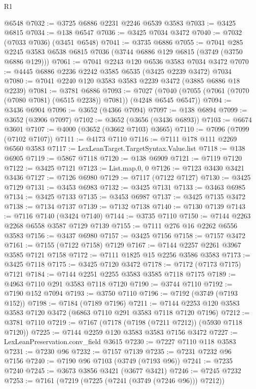 \begin{lexlean}{R1}
\begin{coremodule}
    @6548
@7032 := @3725 @6886 @2231 @2246 @6539 @3583
@7033 := @3425 @6815
@7034 := @138 @6547
@7036 := @3425 @7034 @3472
@7040 := @7032 (@7033 @7036) (@3451 @6548)
@7041 := @3735 @6886
@7055 := @7041
    @285
    @2245
    @3583
    @6538
    @6815
    @7036
    (@3744 @6886 @129 @6815 (@3749 (@3750 @6886 @129)))
@7061 := @7041 @2243 @120 @6536 @3583 @7034 @3472
@7070 := @4445 @6886 @2236 @2242 @3585 @6535 (@3425 @2239 @3472) @7034
@7080 := @7041 @2240 @120 @3583 @3583 @2239 @3472 (@3885 @6886 @18 @2239)
@7081 := @3781 @6886
@7093 := @7027 (@7040 (@7055 (@7061 (@7070 (@7080 @7081) (@6515 @2238)) @7081)) (@4248 @6545 @6547))
@7094 := @3436 @6904
@7096 := @3652 (@4366 @7094)
@7097 := @138 @6894
@7099 := @3652 (@3906 @7097)
@7102 := @3652 (@3656 (@3436 @6893))
@7103 := @6674 @3601
@7107 := @4000 (@3652 (@3662 @7103) @3665)
@7110 := @7096 (@7099 (@7102 @7107))
@7111 := @4173 @7110
@7116 := @7111 @178 @111 @2269 @6560 @3583
@7117 := LexLeanTarget.TargetSyntax.Value.list
@7118 := @138 @6905
@7119 := @5867 @7118
@7120 := @138 @6909
@7121 := @7119 @7120
@7122 := @3425 @7121
@7123 := List.map.{0, 0}
@7126 := @7123 @3430 @3421 @3436
@7127 := @7126 @6980
@7129 := @7117 (@7122 @7127)
@7130 := @3425 @7129
@7131 := @3453 @6983
@7132 := @3425 @7131
@7133 := @3463 @6985
@7134 := @3425 @7133
@7135 := @3453 @6987
@7137 := @3425 @7135 @3472
@7138 := @7134 @7137
@7139 := @7132 @7138
@7140 := @7130 @7139
@7143 := @7116 @7140 (@3424 @7140)
@7144 := @3735 @7110
@7150 := @7144 @2263 @2268 @6558 @3587 @7129 @7139
@7155 := @7111 @276 @16 @2262 @6556 @3583
@7156 := @3437 @6980
@7157 := @3425 @7156
@7158 := @7157 @3472
@7161 := @7155 (@7122 @7158) @7129
@7167 := @7144 @2257 @2261 @3967 @3585 @7121 @7158
@7172 := @7111 @1825 @15 @2256 @3586 @3583
@7173 := @3425 @7118
@7175 := @3425 @7120 @3472
@7178 := @7172 (@7173 @7175) @7121
@7184 := @7144 @2251 @2255 @3583 @3585 @7118 @7175
@7189 := @4963 @7110 @291 @3583 @7118 @7120
@7190 := @3744 @7110
@7192 := @7190 @152 @7094
@7193 := @3750 @7110
@7196 := @7192 (@3749 (@7193 @152))
@7198 := @7184 (@7189 @7196)
@7211 := @7144 @2253 @120 @3583 @3583 @7120 @3472 (@6863 @7110 @291 @3583 @7118 @7120 @7196)
@7212 := @3781 @7110
@7219 := @7167 (@7178 (@7198 (@7211 @7212)) (@5930 @7118 @7120))
@7225 := @7144 @2259 @120 @3583 @3583 @7156 @3472
@7227 := LexLeanPreservation.conv_field @3615
@7230 := @7227 @7110 @118 @3583
@7231 := @7230 @96
@7232 := @7157 @7139
@7235 := @7231 @7232 @96 @7156
@7240 := @7190 @96 @7103 (@3749 (@7193 @96))
@7241 := @7235 @7240
@7245 := @3673 @3856 @3421 (@3677 @3421)
@7246 := @7245 @7232
@7253 := @7161 (@7219 (@7225 (@7241 (@3749 (@7246 @96))) @7212))

\end{coremodule}
\end{lexlean}

